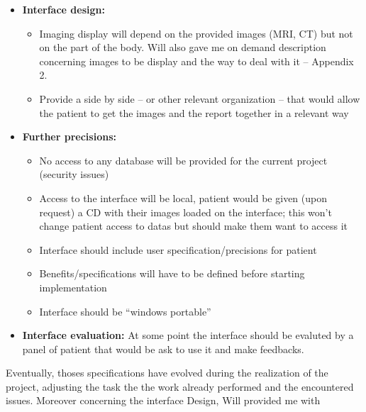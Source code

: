 \begin{itemize}
\item \textbf{Interface design:}
\newline \vspace{5mm}
\begin{itemize}
\item Imaging display will depend on the provided images (MRI, CT) but not on the part of the body. Will also gave me on demand description concerning images to be display and the way to deal with it – Appendix 2.
\item Provide a side by side – or other relevant organization – that would allow the patient to get the images and the report together in a relevant way

\end{itemize}

\newline \vspace{5mm}

\item \textbf{Further precisions:}
\newline \vspace{5mm}
\begin{itemize}
\item No access to any database will be provided for the current project (security issues) 
\item Access to the interface will be local, patient would be given (upon request) a CD with their images loaded on the interface; this won’t change patient access to datas but should make them want to access it
\item Interface should include user specification/precisions for patient 
\item Benefits/specifications will have to be defined before starting implementation
\item Interface should be “windows portable” 
\end{itemize}

\newline \vspace{5mm}

\item \textbf{Interface evaluation:}
\newline \vspace{5mm}
At some point the interface should be evaluted by a panel of patient that would be ask to use it and make feedbacks.


\end{itemize}


\newline \vspace{5mm}
Eventually, thoses specifications have evolved during the realization of the project, adjusting the task the the work already performed and the encountered issues. Moreover concerning the interface Design, Will provided me with 



